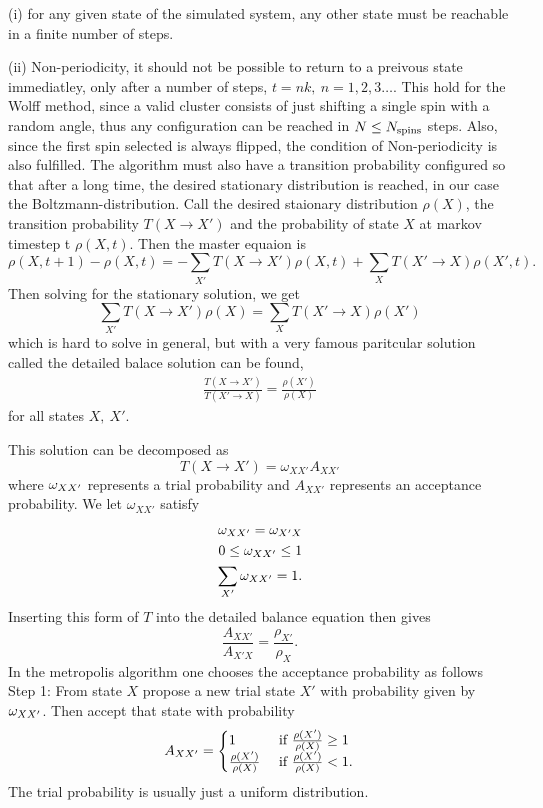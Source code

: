 (i) for any given state of the simulated system, any other state must be reachable in a finite number of steps.

(ii) Non-periodicity, it should not be possible to return to a preivous state immediatley, only after a number of steps, $t =nk,~ n = 1,2,3\dots$.
This hold for the Wolff method, since a valid cluster consists of just shifting a single spin with a random angle, thus any configuration can be reached in $N \leq N_{\textrm{spins}}$ steps. Also, since the first spin selected is always flipped, the condition of Non-periodicity is also fulfilled.
The algorithm must also have a transition probability configured so that after a long time, the desired stationary distribution is reached, in our case the Boltzmann-distribution.
Call the desired staionary distribution $\rho(X)$, the transition probability $T(X \rightarrow X')$ and the probability of state $X$ at markov timestep t $\rho(X,t)$.
Then the master equaion is 
\begin{equation}
  \rho(X, t+1) - \rho(X,t) = -\sum_{X'} T(X\rightarrow X')\rho(X,t) +\sum_{X} T(X'\rightarrow X)\rho(X',t).
\end{equation}
Then solving for the stationary solution, we get
\begin{equation}
  \sum_{X'}T(X\rightarrow X') \rho(X) =  \sum_{X}T(X'\rightarrow X) \rho(X')
\end{equation}
which is hard to solve in general, but with a very famous paritcular solution called the detailed balace solution can be found,
\begin{align}
  \frac{T(X\rightarrow X')}{T(X'\rightarrow X)} = \frac{\rho(X')}{\rho(X)} 
  \label{eq:detbal}
\end{align}
for all states $X,~X'$.

This solution can be decomposed as
\begin{equation}
  T(X\rightarrow X') = \omega_{XX'} A_{XX'}
\end{equation}
where $\omega_{XX'}$ represents a trial probability and $A_{XX'}$ represents an acceptance probability.
We let $\omega_{XX'}$ satisfy
\begin{align}
  \omega_{XX'} = \omega_{X'X}\\
  0 \leq \omega_{XX'} \leq 1\\
  \sum_{X'} \omega_{XX'} = 1.
\end{align}
Inserting this form of $T$ into the detailed balance equation then gives
\begin{equation}
  \frac{A_{XX'}}{A_{X'X}} = \frac{\rho_{X'}}{\rho_{X}}.
\end{equation}
In the metropolis algorithm one chooses the acceptance probability as follows
Step 1: From state $X$ propose a new trial state $X'$ with probability given by $\omega_{XX'}$. Then accept that state with probability 
\begin{equation}
  A_{XX'} = 
  \begin{cases}
    	1 &\textrm{ if } \frac{\rho(X')}{\rho(X)} \geq 1\\
	\frac{\rho(X')}{\rho(X)}&\textrm{ if } \frac{\rho(X')}{\rho(X)} < 1 .
  \end{cases}
\end{equation}
The trial probability is usually just a uniform distribution.
